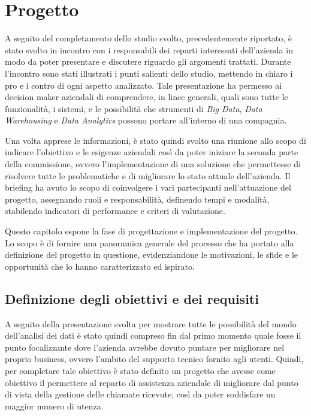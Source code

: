 \chapter{Progetto}
\label{ch:Project}

A seguito del completamento dello studio svolto, precedentemente riportato, è stato svolto in incontro con i responsabili dei reparti interessati dell'azienda in modo da poter presentare e discutere riguardo gli argomenti trattati. Durante l'incontro sono stati illustrati i punti salienti dello studio, mettendo in chiaro i pro e i contro di ogni aspetto analizzato. Tale presentazione ha permesso ai decision maker aziendali di comprendere, in linee generali, quali sono tutte le funzionalità, i sistemi, e le possibilità che strumenti di \textit{Big Data}, \textit{Data Warehousing} e \textit{Data Analytics} possono portare all'interno di una compagnia. 

Una volta apprese le informazioni, è stato quindi svolto una riunione allo scopo di indicare l'obiettivo e le esigenze aziendali così da poter iniziare la seconda parte della commissione, ovvero l'implementazione di una soluzione che permettesse di risolvere tutte le problematiche e di migliorare lo stato attuale dell'azienda. Il briefing ha avuto lo scopo di coinvolgere i vari partecipanti nell'attuazione del progetto, assegnando ruoli e responsabilità, definendo tempi e modalità, stabilendo indicatori di performance e criteri di valutazione.

Questo capitolo espone la fase di progettazione e implementazione del progetto. Lo scopo è di fornire una panoramica generale del processo che ha portato alla definizione del progetto in questione, evidenziandone le motivazioni, le sfide e le opportunità che lo hanno caratterizzato ed ispirato.

\section{Definizione degli obiettivi e dei requisiti}

A seguito della presentazione svolta per mostrare tutte le possibilità del mondo dell'analisi dei dati è stato quindi compreso fin dal primo momento quale fosse il punto focalizzante dove l'azienda avrebbe dovuto puntare per migliorare nel proprio business, ovvero l'ambito del supporto tecnico fornito agli utenti. Quindi, per completare tale obiettivo è stato definito un progetto che avesse come obiettivo il permettere al reparto di assistenza aziendale di migliorare dal punto di vista della gestione delle chiamate ricevute, così da poter soddisfare un maggior numero di utenza.

